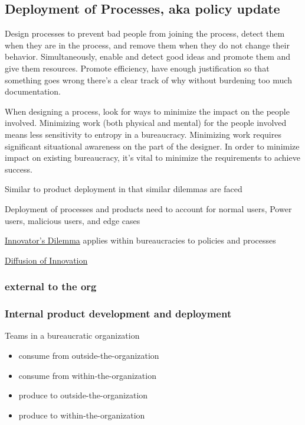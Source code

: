 \subsection{Deployment of Processes, aka policy update}

Design processes to prevent bad people from joining the process, detect them when they are in the process, and remove them when they do not change their behavior. Simultaneously, enable and detect good ideas and promote them and give them resources.
Promote efficiency, have enough justification so that something goes wrong there's a clear track of why without burdening too much documentation.


When designing a process, look for ways to minimize the impact on the people involved. Minimizing work (both physical and mental) for the people involved means less sensitivity to entropy in a bureaucracy. Minimizing work requires significant situational awareness on the part of the designer. In order to minimize impact on existing bureaucracy, it's vital to minimize the requirements to achieve success.


Similar to product deployment in that similar dilemmas are faced

Deployment of processes and products need to account for 
normal users, Power users, malicious users, and edge cases

\href{https://en.m.wikipedia.org/wiki/The_Innovator's_Dilemma}{Innovator's Dilemma} applies within bureaucracies to policies and processes

\href{https://en.wikipedia.org/wiki/Diffusion_of_innovations}{Diffusion of Innovation}

\subsubsection{external to the org}


\subsubsection{Internal product development and deployment\label{sec:internal_product}}

Teams in a bureaucratic organization 
\begin{itemize}
    \item consume from outside-the-organization
    \item consume from within-the-organization
    \item produce to outside-the-organization
    \item produce to within-the-organization
\end{itemize}


